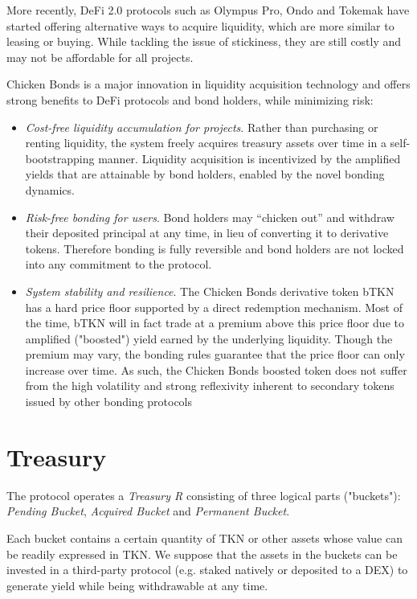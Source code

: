 \documentclass{article}
\begin{document}
More recently, DeFi 2.0 protocols such as Olympus Pro, Ondo and Tokemak have started offering alternative ways to acquire liquidity, which are more similar to leasing or buying. While tackling the issue of stickiness, they are still costly and may not be affordable for all projects.

Chicken Bonds is a major innovation in liquidity acquisition technology and offers strong benefits to DeFi protocols and bond holders, while minimizing risk:

\begin{itemize}
    \item \textit{Cost-free liquidity accumulation for projects}. Rather than purchasing or renting liquidity, the system freely acquires treasury assets over time in a self-bootstrapping manner. Liquidity acquisition is incentivized by the amplified yields that are attainable by bond holders, enabled by the novel bonding dynamics.
    \item \textit{Risk-free bonding for users}. Bond holders may “chicken out” and withdraw their deposited principal at any time, in lieu of converting it to derivative tokens. Therefore bonding is fully reversible and bond holders are not locked into any commitment to the protocol.
    \item \textit{System stability and resilience}. The Chicken Bonds derivative token bTKN has a hard price floor supported by a direct redemption mechanism. Most of the time, bTKN will in fact trade at a premium above this price floor due to amplified ("boosted") yield earned by the underlying liquidity. Though the premium may vary, the bonding rules guarantee that the price floor can only increase over time. As such, the Chicken Bonds boosted token does not suffer from the high volatility and strong reflexivity inherent to secondary tokens issued by other bonding protocols
\end{itemize}

\section{Treasury}
The protocol operates a \textit{Treasury R} consisting of three logical parts ("buckets"):  \textit{Pending Bucket}, \textit{Acquired Bucket} and \textit{Permanent Bucket}.

Each bucket contains a certain quantity of TKN or other assets whose value can be readily expressed in TKN. We suppose that the assets in the buckets can be invested in a third-party protocol (e.g. staked natively or deposited to a DEX) to generate yield while being withdrawable at any time. 
\end{document}
